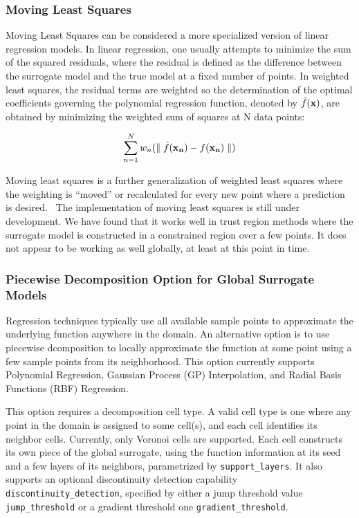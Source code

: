 \subsubsection{Moving Least Squares}\label{models:surf:mls}

Moving Least Squares can be considered a more specialized 
version of linear regression models.  In linear regression, 
one usually attempts to minimize the sum of the squared residuals, 
where the residual is defined as the difference between the 
surrogate model and the true model at a fixed number of points. 
In weighted least squares, the residual terms are weighted so the 
determination of the optimal coefficients governing the polynomial 
regression function, denoted by $\hat{f}({\bf x})$, are obtained by 
minimizing the weighted sum of squares at N data points: 

\begin{equation}
  \sum_{n=1}^{N}w_{n}({\parallel \hat{f}({\bf x_{n}})-f({\bf x_{n}})\parallel})
  \label{models:surf:equation12}  
\end{equation}

Moving least squares is a further generalization of weighted least squares
where the weighting is ``moved'' or recalculated for every new point where 
a prediction is desired.~\cite{Nea04}  The implementation of 
moving least squares 
is still under development.  We have found that it works well 
in trust region methods where the surrogate model is constructed in 
a constrained region over a few points.  It does not appear to be working 
as well globally, at least at this point in time.

\subsubsection{Piecewise Decomposition Option for Global Surrogate Models}\label{models:surf:piecewise_decomp}
Regression techniques typically use all available sample points to approximate the underlying function anywhere in the domain. An alternative option is to use piecewise dcomposition to locally approximate the function at some point using a few sample points from its neighborhood. This option currently supports Polynomial Regression, Gaussian Process (GP) Interpolation, and Radial Basis Functions (RBF) Regression. 

This option requires a decomposition cell type. A valid cell type is one where any point in the domain is assigned to some cell(s), and each cell identifies its neighbor cells. Currently, only Voronoi cells are supported. Each cell constructs its own piece of the global surrogate, using the function information at its seed and a few layers of its neighbors, parametrized by \texttt{support_layers}. It also supports an optional discontinuity detection capability \texttt{discontinuity_detection}, specified by either a jump threshold value \texttt{jump_threshold} or a gradient threshold one \texttt{gradient_threshold}. 

